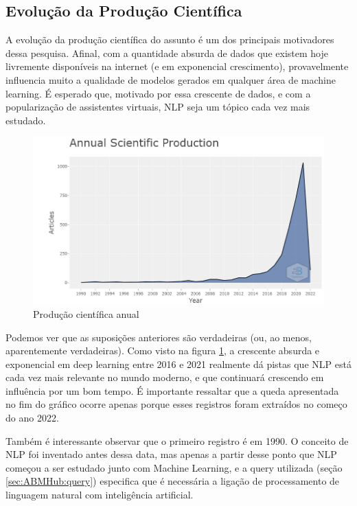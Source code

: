 \subsection{Evolução da Produção Científica}


A evolução da produção científica do assunto é um dos principais motivadores dessa pesquisa. Afinal, com a quantidade absurda de dados que existem hoje livremente disponíveis na internet (e em exponencial crescimento), provavelmente influencia muito a qualidade de modelos gerados em qualquer área de machine learning. É esperado que, motivado por essa crescente de dados, e com a popularização de assistentes virtuais, NLP seja um tópico cada vez mais estudado.

 \begin{figure}
    \centering
    \includegraphics[width=1\textwidth]{experiments/ABMHub/PesquisaBibliometrica/NLP/anualScientificProduction.png}
    \caption{Produção científica anual}
    \label{fig:ABMHub:ASP}
\end{figure}

Podemos ver que as suposições anteriores são verdadeiras (ou, ao menos, aparentemente verdadeiras). Como visto na figura \ref{fig:ABMHub:ASP}, a crescente absurda e exponencial em deep learning entre 2016 e 2021 realmente dá pistas que NLP está cada vez mais relevante no mundo moderno, e que continuará crescendo em influência por um bom tempo. É importante ressaltar que a queda apresentada no fim do gráfico ocorre apenas porque esses registros foram extraídos no começo do ano 2022.

Também é interessante observar que o primeiro registro é em 1990. O conceito de NLP foi inventado antes dessa data, mas apenas a partir desse ponto que NLP começou a ser estudado junto com Machine Learning, e a query utilizada (seção \ref{sec:ABMHub:query}) especifica que é necessária a ligação de processamento de linguagem natural com inteligência artificial.

